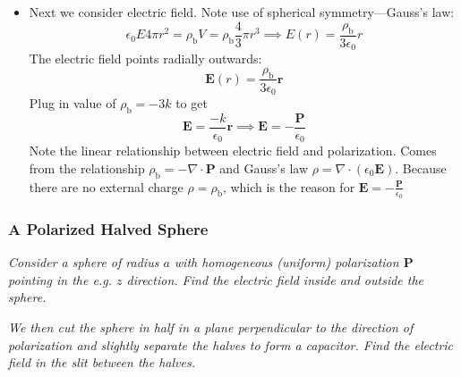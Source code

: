 \documentclass[11pt, a4paper]{article}
\renewcommand{\vec}[1]{\bm{#1}} %
\renewcommand{\r}{\vec{r}}
\newcommand{\E}{\vec{E}}  %
\newcommand{\ee}{\epsilon_{0}}  %
\renewcommand{\P}{\vec{P}}  %
\renewcommand{\div}{\nabla \cdot}
\begin{document}
\begin{itemize}
	\item Next we consider electric field. Note use of spherical symmetry---Gauss's law:
	\begin{equation*}
		\ee E 4\pi r^{2} = \rho_{\text{b}} V = \rho_{\text{b}} \frac{4}{3}\pi r^{3} \implies E(r) = \frac{\rho_{\text{b}}}{3 \ee} r
	\end{equation*} 
	The electric field points radially outwards:
	\begin{equation*}
		\E(r) = \frac{\rho_{\text{b}}}{3 \ee} \r
	\end{equation*}
	Plug in value of $ \rho_{\text{b}} = -3k $ to get
	\begin{equation*}
		\E = \frac{-k}{\ee}\r \implies \E = - \frac{\P}{\ee}
	\end{equation*}
	Note the linear relationship between electric field and polarization. Comes from the relationship $ \rho_{\text{b}} = - \div \P $ and Gauss's law $ \rho = \div (\ee \E) $. Because there are no external charge $ \rho = \rho_{\text{b}} $, which is the reason for $ \E = - \frac{\P}{\ee} $

\end{itemize}

\subsubsection{A Polarized Halved Sphere}
\textit{Consider a sphere of radius $ a $ with homogeneous (uniform) polarization $ \P $ pointing in the e.g. $ z $ direction. Find the electric field inside and outside the sphere. }

\textit{We then cut the sphere in half in a plane perpendicular to the direction of polarization and slightly separate the halves to form a capacitor. Find the electric field in the slit between the halves.}
\end{document}
